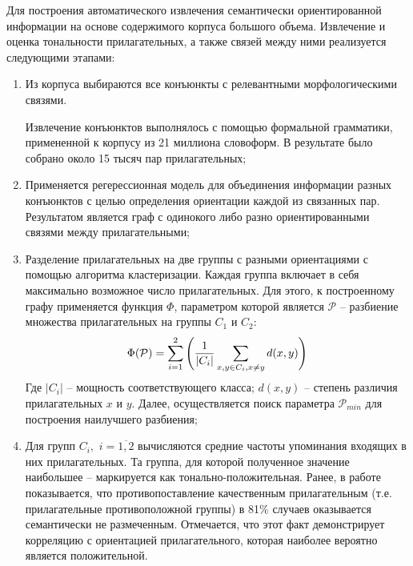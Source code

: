         Для построения автоматического извлечения семантически ориентированной
        информации на основе содержимого корпуса большого объема.
        Извлечение и оценка тональности прилагательных, а также связей между ними
        реализуется следующими этапами:
        \begin{enumerate}
            \item Из корпуса выбираются все конъюнкты с релевантными
                морфологическими связями.

                Извлечение конъюнктов выполнялось с помощью формальной
                грамматики, примененной к корпусу из 21 миллиона словоформ.
                В результате было собрано около 15 тысяч пар прилагательных;

            \item Применяется регерессионная модель для объединения информации
                разных конъюнктов с целью определения ориентации каждой из связанных пар.
                Результатом является граф с одинокого либо разно ориентированными
                связями между прилагательными;
            \item Разделение прилагательных на две группы с разными ориентациями
                с помощью алгоритма кластеризации. Каждая группа включает в себя
                максимально возможное число прилагательных.
                Для этого, к построенному графу применяется функция $\Phi$,
                параметром которой является $\mathcal{P}$ -- разбиение множества
                прилагательных на группы $C_1$ и $C_2$:
                \begin{equation}
                    \Phi(\mathcal{P}) = \sum\limits_{i=1}^2 \Bigg( \dfrac{1}{|C_i|} \sum\limits_{x,y \in C_i, \\ x \neq y} d(x,y) \Bigg)
                \end{equation}
                Где $|C_i|$ -- мощность соответствующего класса; $d(x, y)$ --
                степень различия прилагательных $x$ и $y$.
                Далее, осуществляется поиск параметра $\mathcal{P}_{min}$ для
                построения наилучшего разбиения;

            \item Для групп $C_i, \hspace{4pt} i=\overline{1,2}$ вычисляются
                средние частоты упоминания входящих в них прилагательных.
                Та группа, для которой полученное значение наибольшее --
                маркируется как тонально-положительная.
                Ранее, в работе \cite{lexiconAdjectivesPrevious} показывается,
                что противопоставление качественным прилагательным (т.е.
                прилагательные противоположной группы) в 81\% случаев оказывается
                семантически не размеченным. Отмечается, что этот факт демонстрирует
                корреляцию с ориентацией прилагательного, которая наиболее вероятно
                является положительной.
        \end{enumerate}

